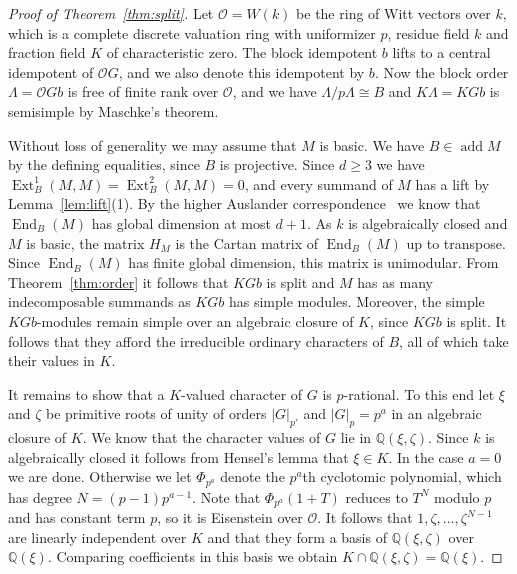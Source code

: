 \documentclass[11pt,a4paper,reqno]{amsart}
\newcommand{\kk}{k}
\theoremstyle{definition}
\DeclareMathOperator{\End}{End}
\DeclareMathOperator{\Ext}{Ext}
\DeclareMathOperator{\add}{add}
\newcommand{\OO}{\mathcal O}
\begin{document}
\begin{proof}[Proof of Theorem~\ref{thm:split}]
  Let $\OO=W(\kk)$ be the ring of Witt vectors over $\kk$, which is a
  complete discrete valuation ring with uniformizer $p$, residue field
  $\kk$ and fraction field $K$ of characteristic zero.  The block
  idempotent $b$ lifts to a central idempotent of $\OO G$, and we also
  denote this idempotent by $b$.  Now the block order $\Lambda=\OO Gb$
  is free of finite rank over $\OO$, and we have
  $\Lambda/p\Lambda\cong B$ and $K\Lambda=KGb$ is semisimple by
  Maschke's theorem.

  Without loss of generality we may assume that $M$ is basic.  We have
  $B\in\add M$ by the defining equalities, since $B$ is projective.
  Since $d\geq3$ we have $\Ext_{B}^{1}(M,M)=\Ext_{B}^{2}(M,M)=0$, and
  every summand of $M$ has a lift by Lemma~\ref{lem:lift}(1).  By the
  higher Auslander correspondence~\cite[Theorem 0.2]{IyamaAC} we know
  that $\End_{B}(M)$ has global dimension at most $d+1$.  As $\kk$ is
  algebraically closed and $M$ is basic, the matrix $H_{M}$ is the
  Cartan matrix of $\End_{B}(M)$ up to transpose.  Since $\End_{B}(M)$
  has finite global dimension, this matrix is unimodular.  From
  Theorem~\ref{thm:order} it follows that $KGb$ is split and $M$ has
  as many indecomposable summands as $KGb$ has simple modules.
  Moreover, the simple $KGb$-modules remain simple over an algebraic
  closure of $K$, since $KGb$ is split.  It follows that they afford
  the irreducible ordinary characters of $B$, all of which take their
  values in $K$.

  It remains to show that a $K$-valued character of $G$ is
  $p$-rational.  To this end let $\xi$ and $\zeta$ be primitive roots
  of unity of orders $|G|_{p'}$ and $|G|_{p}=p^{a}$ in an algebraic
  closure of $K$.  We know that the character values of $G$ lie in
  $\mathbb Q(\xi,\zeta)$.  Since $\kk$ is algebraically closed it
  follows from Hensel's lemma that $\xi\in K$.  In the case $a=0$ we
  are done.  Otherwise we let $\Phi_{p^{a}}$ denote the $p^{a}$th
  cyclotomic polynomial, which has degree $N=(p-1)p^{a-1}$.  Note that
  $\Phi_{p^{a}}(1+T)$ reduces to $T^{N}$ modulo $p$ and has constant
  term $p$, so it is Eisenstein over $\OO$.  It follows that
  $1,\zeta,\ldots,\zeta^{N-1}$ are linearly independent over $K$ and
  that they form a basis of $\mathbb Q(\xi,\zeta)$ over
  $\mathbb Q(\xi)$.  Comparing coefficients in this basis we obtain
  $K\cap\mathbb Q(\xi,\zeta)=\mathbb Q(\xi)$.
\end{proof}
\end{document}
